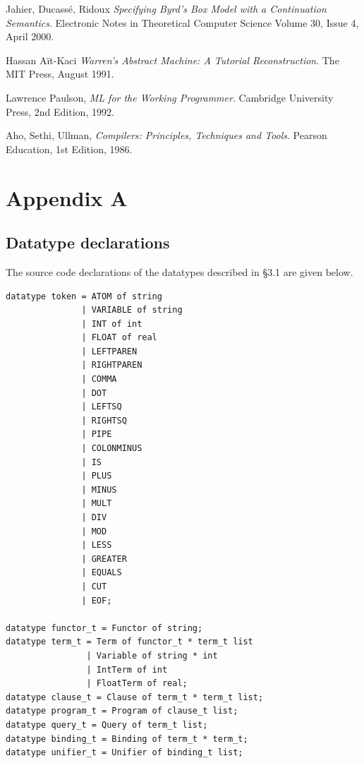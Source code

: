 \documentclass[12pt]{article}
\begin{document}
\begin{thebibliography}{9}

  Jahier, Ducass\'e, Ridoux
  \emph{Specifying Byrd's Box Model with a Continuation Semantics}.
  Electronic Notes in Theoretical Computer Science
  Volume 30, Issue 4,
  April 2000.

  Hassan A\"it-Kaci
  \emph{Warren's Abstract Machine: A Tutorial Reconstruction}.
  The MIT Press,
  August 1991.
  
  Lawrence Paulson,
  \emph{ML for the Working Programmer}.
  Cambridge University Press,
  2nd Edition,
  1992.
  
  Aho, Sethi, Ullman,
  \emph{Compilers: Principles, Techniques and Tools}.
  Pearson Education,
  1st Edition,
  1986.

\end{thebibliography}

\newpage

\section*{Appendix A}

\subsection*{Datatype declarations}

The source code declarations of the datatypes described in \S3.1 are given below.

\begin{verbatim}
datatype token = ATOM of string
               | VARIABLE of string
               | INT of int
               | FLOAT of real
               | LEFTPAREN
               | RIGHTPAREN
               | COMMA
               | DOT
               | LEFTSQ
               | RIGHTSQ
               | PIPE
               | COLONMINUS
               | IS
               | PLUS
               | MINUS
               | MULT
               | DIV
               | MOD
               | LESS
               | GREATER
               | EQUALS
               | CUT
               | EOF;

datatype functor_t = Functor of string;
datatype term_t = Term of functor_t * term_t list
                | Variable of string * int
                | IntTerm of int
                | FloatTerm of real;
datatype clause_t = Clause of term_t * term_t list;
datatype program_t = Program of clause_t list;
datatype query_t = Query of term_t list;
datatype binding_t = Binding of term_t * term_t;
datatype unifier_t = Unifier of binding_t list;

\end{verbatim}
\end{document}
